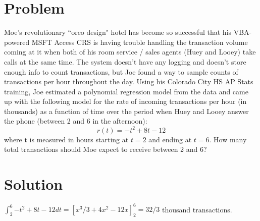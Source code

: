 \documentclass[11pt,a4paper]{report}
\theoremstyle{plain}
\theoremstyle{definition}
\theoremstyle{remark}
\begin{document}
\section*{Problem}
Moe's revolutionary ``oreo design" hotel has become so successful that his VBA-powered MSFT Access CRS is having trouble handling the transaction volume coming at it when both of his room service / sales agents (Huey and Looey) take calls at the same time.  The system doesn't have any logging and doesn't store enough info to count transactions, but Joe found a way to sample counts of transactions per hour throughout the day.  Using his Colorado City HS AP Stats training, Joe estimated a polynomial regression model from the data and came up with the following model for the rate of incoming transactions per hour (in thousands) as a function of time over the period when Huey and Looey answer the phone (between 2 and 6 in the afternoon):
$$r(t) = -t^2 +8t - 12$$
where t is measured in hours starting at $t = 2$ and ending at $t = 6$.  How many total transactions should Moe expect to receive between 2 and 6?

\section*{Solution}
$\int_{2}^{6}{-t^2 + 8t - 12}dt = \left[x^3/3 + 4x^2 - 12x\right]_2^6 = 32/3$ thousand transactions.
\end{document}
